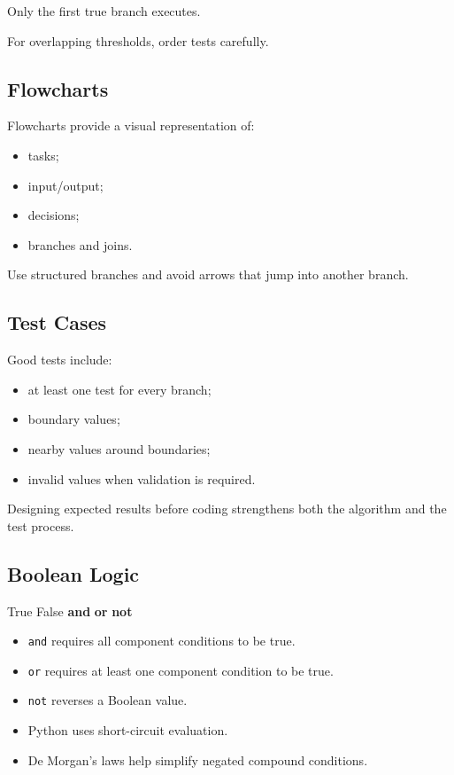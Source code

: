\documentclass[
  11pt,
  a4paper,
]{article}
\newenvironment{Shaded}{}{}
\newcommand{\KeywordTok}[1]{\textcolor[rgb]{0.00,0.44,0.13}{\textbf{#1}}}
\newcommand{\VariableTok}[1]{\textcolor[rgb]{0.10,0.09,0.49}{#1}}
\providecommand{\tightlist}{%
  \setlength{\itemsep}{0pt}\setlength{\parskip}{0pt}}
\begin{document}
Only the first true branch executes.

For overlapping thresholds, order tests carefully.

\subsection{Flowcharts}\label{flowcharts}

Flowcharts provide a visual representation of:

\begin{itemize}
\tightlist
\item
  tasks;
\item
  input/output;
\item
  decisions;
\item
  branches and joins.
\end{itemize}

Use structured branches and avoid arrows that jump into another branch.

\subsection{Test Cases}\label{test-cases}

Good tests include:

\begin{itemize}
\tightlist
\item
  at least one test for every branch;
\item
  boundary values;
\item
  nearby values around boundaries;
\item
  invalid values when validation is required.
\end{itemize}

Designing expected results before coding strengthens both the algorithm
and the test process.

\subsection{Boolean Logic}\label{boolean-logic}

\begin{Shaded}
\begin{Highlighting}[]
\VariableTok{True}
\VariableTok{False}
\KeywordTok{and}
\KeywordTok{or}
\KeywordTok{not}
\end{Highlighting}
\end{Shaded}

\begin{itemize}
\tightlist
\item
  \texttt{and} requires all component conditions to be true.
\item
  \texttt{or} requires at least one component condition to be true.
\item
  \texttt{not} reverses a Boolean value.
\item
  Python uses short-circuit evaluation.
\item
  De Morgan's laws help simplify negated compound conditions.
\end{itemize}
\end{document}
